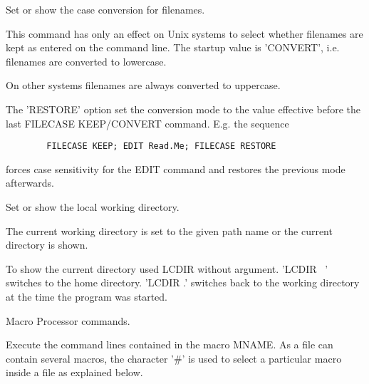    \par
Set or show the case conversion for filenames.  

   \par
This command has only an effect on Unix systems to select whether filenames 
   are kept as entered on the command line.  The startup value is 'CONVERT', 
   i.e. filenames are converted to lowercase.  

   \par
On other systems filenames are always converted to uppercase.  

   \par
The 'RESTORE' option set the conversion mode to the value effective before 
   the last FILECASE KEEP/CONVERT command.  E.g. the sequence 
\begin{verbatim}
        FILECASE KEEP; EDIT Read.Me; FILECASE RESTORE
\end{verbatim}
   \par
forces case sensitivity for the EDIT command and restores the previous mode 
   afterwards.  

\ENDCMD


\BEGARG
{}
\ENDARG

   \par
Set or show the local working directory.  

   \par
The current working directory is set to the given path name or the current 
   directory is shown.  

   \par
To show the current directory used LCDIR without argument.  'LCDIR ~' 
   switches to the home directory.  'LCDIR .' switches back to the working 
   directory at the time the program was started.  

\ENDCMD
{}
\ifMENUtext
   \par
Macro Processor commands.  


\fi


\BEGARG
{}
\ENDARG

   \par
Execute the command lines contained in the macro MNAME.  As a file can 
   contain several macros, the character '\#' is used to select a particular 
   macro inside a file as explained below.  

